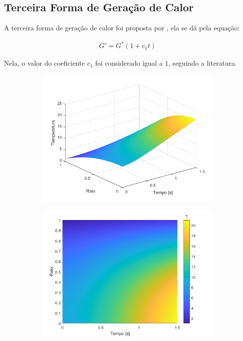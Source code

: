 \subsection{Terceira Forma de Geração de Calor}

A terceira forma de geração de calor foi proposta por \citet{soares2017}, ela se dá pela equação:

\begin{gather}
    G ' = G ^* (1 + c _1 t)
    \label{eq:third_form_of_heat}
\end{gather}

Nela, o valor do coeficiente \(c_1\) foi considerado igual a \(1\), seguindo a literatura.

\begin{figure}[H]
    \centering
    \caption{Perfis de temperatura para terceira forma de geração de calor: (a) perspectiva isométrica; (b) vista superior.}
    
    \begin{subfigure}{0.45\textwidth}
        \includegraphics[width=1\linewidth]{figures/results/Fig07.png} 
        \caption{}
    \end{subfigure}
    \begin{subfigure}{0.45\textwidth}
        \includegraphics[width=1\linewidth]{figures/results/Fig08.png}
        \caption{}
    \end{subfigure}
    

\end{figure}
